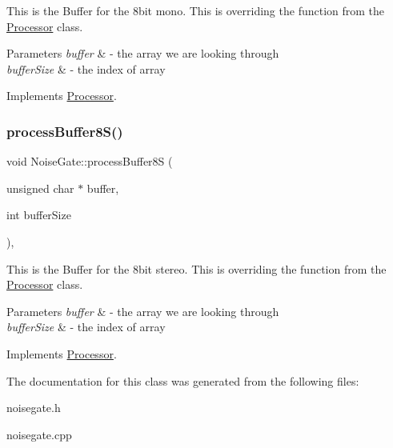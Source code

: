This is the Buffer for the 8bit mono. This is overriding the function from the \hyperlink{classProcessor}{Processor} class. 
\begin{DoxyParams}{Parameters}
{\em buffer} & -\/ the array we are looking through \\
\hline
{\em buffer\+Size} & -\/ the index of array \\
\hline
\end{DoxyParams}


Implements \hyperlink{classProcessor_aa28dc423c5ee21b11d907a7c13ad81c8}{Processor}.

\mbox{\label{classNoiseGate_a95221bfd9afb4a23bfb0b63122e62f26}} 
\subsubsection{\texorpdfstring{process\+Buffer8\+S()}{processBuffer8S()}}
{\footnotesize\ttfamily void Noise\+Gate\+::process\+Buffer8S (\begin{DoxyParamCaption}\item[{unsigned char $\ast$}]{buffer,  }\item[{int}]{buffer\+Size }\end{DoxyParamCaption})\hspace{0.3cm}{\ttfamily [override]}, {\ttfamily [virtual]}}

This is the Buffer for the 8bit stereo. This is overriding the function from the \hyperlink{classProcessor}{Processor} class. 
\begin{DoxyParams}{Parameters}
{\em buffer} & -\/ the array we are looking through \\
\hline
{\em buffer\+Size} & -\/ the index of array \\
\hline
\end{DoxyParams}


Implements \hyperlink{classProcessor_aa1342ae07ebced7b3232d2badf06dd3a}{Processor}.



The documentation for this class was generated from the following files\+:\begin{DoxyCompactItemize}
\item 
noisegate.\+h\item 
noisegate.\+cpp\end{DoxyCompactItemize}
